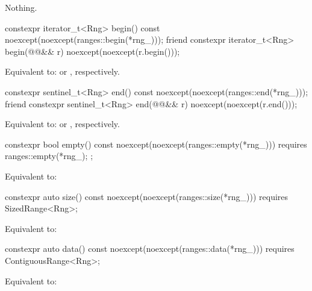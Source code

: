 {\begin{itemdescr}
\pnum
\oldtxt{\returns}  

\pnum
\throws Nothing.
\end{itemdescr}

%
\begin{itemdecl}
constexpr iterator_t<Rng> begin() const
  noexcept(noexcept(ranges::begin(*rng_)));
friend constexpr iterator_t<Rng> begin(@@&& r)
  noexcept(noexcept(r.begin()));
\end{itemdecl}

\begin{itemdescr}
\pnum
\effects Equivalent to: 
or , respectively.
\end{itemdescr}

%
\begin{itemdecl}
constexpr sentinel_t<Rng> end() const
  noexcept(noexcept(ranges::end(*rng_)));
friend constexpr sentinel_t<Rng> end(@@&& r)
  noexcept(noexcept(r.end()));
\end{itemdecl}

\begin{itemdescr}
\pnum
\effects Equivalent to: 
or , respectively.
\end{itemdescr}

%
\begin{itemdecl}
constexpr bool empty() const
  noexcept(noexcept(ranges::empty(*rng_)))
  requires { ranges::empty(*rng_); };
\end{itemdecl}

\begin{itemdescr}
\pnum
\effects Equivalent to: 
\end{itemdescr}

%
\begin{itemdecl}
constexpr auto size() const
  noexcept(noexcept(ranges::size(*rng_)))
  requires SizedRange<Rng>;
\end{itemdecl}

\begin{itemdescr}
\pnum
\effects Equivalent to: 
\end{itemdescr}

%
\begin{itemdecl}
constexpr auto data() const
  noexcept(noexcept(ranges::data(*rng_)))
  requires ContiguousRange<Rng>;
\end{itemdecl}

\begin{itemdescr}
\pnum
\effects Equivalent to: 
\end{itemdescr}
} %

